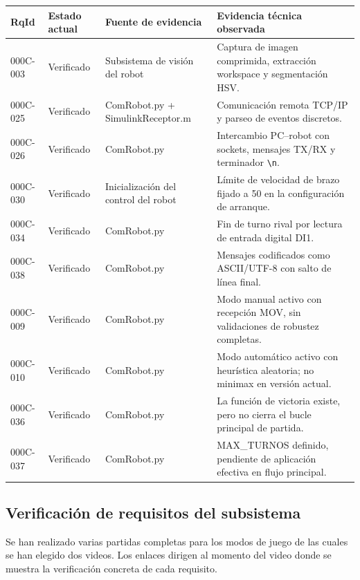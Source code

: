 \documentclass[12pt,a4paper]{article}
\begin{document}
{\footnotesize
\begin{longtable}{@{}>{\raggedright\arraybackslash}p{} >{\raggedright\arraybackslash}p{} >{\raggedright\arraybackslash}p{} >{\raggedright\arraybackslash}p{}@{}}
\toprule
\textbf{RqId} & \textbf{Estado actual} & \textbf{Fuente de evidencia} & \textbf{Evidencia técnica observada} \\
\midrule
\endhead
000C-003 & Verificado & Subsistema de visión del robot & Captura de imagen comprimida, extracción workspace y segmentación HSV. \\
000C-025 & Verificado & ComRobot.py + SimulinkReceptor.m & Comunicación remota TCP/IP y parseo de eventos discretos. \\
000C-026 & Verificado & ComRobot.py & Intercambio PC--robot con sockets, mensajes TX/RX y terminador \texttt{\textbackslash n}. \\
000C-030 & Verificado & Inicialización del control del robot & Límite de velocidad de brazo fijado a 50 en la configuración de arranque. \\
000C-034 & Verificado & ComRobot.py & Fin de turno rival por lectura de entrada digital DI1. \\
000C-038 & Verificado & ComRobot.py & Mensajes codificados como ASCII/UTF-8 con salto de línea final. \\
000C-009 & Verificado & ComRobot.py & Modo manual activo con recepción MOV, sin validaciones de robustez completas. \\
000C-010 & Verificado & ComRobot.py & Modo automático activo con heurística aleatoria; no minimax en versión actual. \\
000C-036 & Verificado & ComRobot.py & La función de victoria existe, pero no cierra el bucle principal de partida. \\
000C-037 & Verificado & ComRobot.py & MAX\_TURNOS definido, pendiente de aplicación efectiva en flujo principal. \\
\bottomrule
\end{longtable}     
}

\subsection{Verificación de requisitos del subsistema}

Se han realizado varias partidas completas para los modos de juego de las cuales se han elegido dos videos. Los enlaces dirigen al momento del video donde se muestra la verificación concreta de cada requisito.
\end{document}
